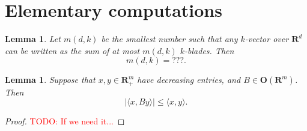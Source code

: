 \documentclass[reqno,11pt]{amsart}
\newcommand{\RR}{\mathbf{R}}
\newcommand{\Orth}{\mathbf{O}}
\newtheorem{lemma}[theorem]{Lemma}
\theoremstyle{definition}
\numberwithin{equation}{section}
\newcommand\todo[1]{\textcolor{red}{TODO: #1}}
\begin{document}
\appendix 
\section{Elementary computations}
\begin{lemma}
Let $m(d, k)$ be the smallest number such that any $k$-vector over $\RR^d$ can be written as the sum of at most $m(d, k)$ $k$-blades.
Then 
\begin{equation}\label{minimal number of blades}
m(d, k) = ???.
\end{equation}
\end{lemma}

\begin{lemma}
Suppose that $x, y \in \RR^m_+$ have decreasing entries, and $B \in \Orth(\RR^m)$. Then
\begin{equation}\label{permute to decreasing}
|\langle x, By\rangle| \leq \langle x, y\rangle.
\end{equation}
\end{lemma}
\begin{proof}
\todo{If we need it...}
\end{proof}

\printbibliography
\end{document}
